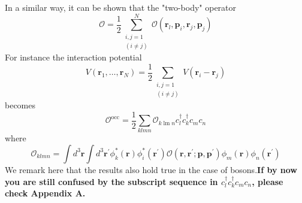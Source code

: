 In a similar way, it can be shown that the "two-body" operator
\begin{equation}\mathcal{O}=\frac{1}{2} \sum_{\substack{i, j=1\\(i \neq j)}}^{N} \mathcal{O}\left(\mathbf{r}_{l}, \mathbf{p}_{i}, \mathbf{r}_{j}, \mathbf{p}_{j}\right)\end{equation}
For instance the interaction potential
\begin{equation}V\left(\mathbf{r}_{1}, \dots, \mathbf{r}_{N}\right)=\frac{1}{2} \sum_{\substack{i, j=1\\ (i \neq j)}} V\left(\mathbf{r}_{i}-\mathbf{r}_{j}\right)
\label{two-body-interaction-occ}
\end{equation}
becomes
\begin{equation}\mathcal{O}^{\mathrm{occ}}=\frac{1}{2} \sum_{k l m n} \mathcal{O}_{k \operatorname{lm} n} c_{l}^{\dagger} c_{k}^{\dagger} c_{m} c_{n}\end{equation}
where
\begin{equation}\mathcal{O}_{klmn}=\int d^{3} \mathbf{r} \int d^{3} \mathbf{r}^{\prime} \phi_{k}^{*}(\mathbf{r}) \phi_{i}^{*}\left(\mathbf{r}^{\prime}\right) \mathcal{O}\left(\mathbf{r}, \mathbf{r}^{\prime} ; \mathbf{p}, \mathbf{p}^{\prime}\right) \phi_{m}(\mathbf{r}) \phi_{n}\left(\mathbf{r}^{\prime}\right)\end{equation}
We remark here that the results also hold true in the case of bosons.\textbf{If by now you are still confused by the subscript sequence in $c_l^{\dagger}c_k^{\dagger}c_mc_n$, please check Appendix A.}

